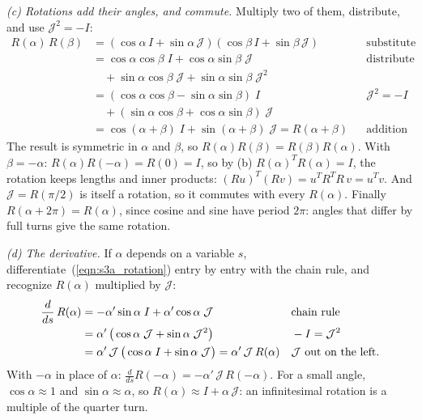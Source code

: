 \emph{(c) Rotations add their angles, and commute.} Multiply two of them, distribute, and use $\mathcal J^2 = -I$:
\begin{align*}
R(\alpha)\,R(\beta) &= (\cos\alpha\, I + \sin\alpha\,\mathcal J)(\cos\beta\, I + \sin\beta\,\mathcal J) && \text{substitute} \\
&= \cos\alpha\cos\beta\; I + \cos\alpha\sin\beta\;\mathcal J && \text{distribute} \\
&\quad + \sin\alpha\cos\beta\;\mathcal J + \sin\alpha\sin\beta\;\mathcal J^2 \\
&= (\cos\alpha\cos\beta - \sin\alpha\sin\beta)\; I && \mathcal J^2 = -I \\
&\quad + (\sin\alpha\cos\beta + \cos\alpha\sin\beta)\;\mathcal J \\
&= \cos(\alpha + \beta)\; I + \sin(\alpha + \beta)\;\mathcal J = R(\alpha + \beta) && \text{addition formulas.}
\end{align*}
The result is symmetric in $\alpha$ and $\beta$, so $R(\alpha)R(\beta) = R(\beta)R(\alpha)$. With $\beta = -\alpha$: $R(\alpha)R(-\alpha) = R(0) = I$, so by (b) $R(\alpha)^TR(\alpha) = I$, the rotation keeps lengths and inner products: $(R u)^T(R v) = u^T R^TR\, v = u^T v$. And $\mathcal J = R(\pi/2)$ is itself a rotation, so it commutes with every $R(\alpha)$. Finally $R(\alpha + 2\pi) = R(\alpha)$, since cosine and sine have period $2\pi$: angles that differ by full turns give the same rotation.

\emph{(d) The derivative.} If $\alpha$ depends on a variable $s$, differentiate~(\ref{eqn:s3a_rotation}) entry by entry with the chain rule, and recognize $R(\alpha)$ multiplied by $\mathcal J$:
\begin{align}
\frac{d}{ds}\, R(\alpha) &= -\alpha'\sin\alpha\; I + \alpha'\cos\alpha\;\mathcal J && \text{chain rule} \notag \\
&= \alpha'\,\big(\cos\alpha\;\mathcal J + \sin\alpha\;\mathcal J^2\big) && -I = \mathcal J^2 \notag \\
&= \alpha'\,\mathcal J\,\big(\cos\alpha\; I + \sin\alpha\;\mathcal J\big) = \alpha'\,\mathcal J\, R(\alpha) && \mathcal J \text{ out on the left.} \label{eqn:s3a_exp_deriv}
\end{align}
With $-\alpha$ in place of $\alpha$: $\frac{d}{ds}R(-\alpha) = -\alpha'\,\mathcal J\, R(-\alpha)$. For a small angle, $\cos\alpha \approx 1$ and $\sin\alpha \approx \alpha$, so $R(\alpha) \approx I + \alpha\,\mathcal J$: an infinitesimal rotation is a multiple of the quarter turn.

